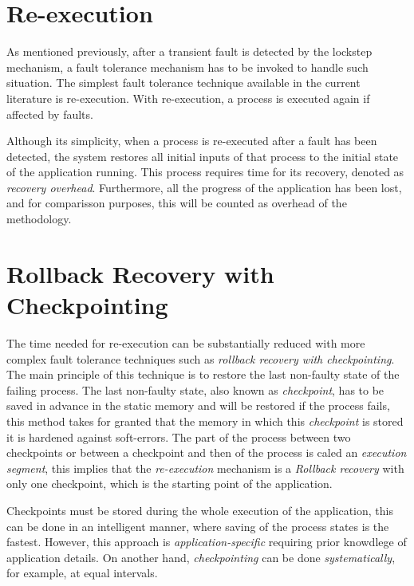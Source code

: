 \documentclass[10pt, a4paper]{report}
\begin{document}
\section{Re-execution}

As mentioned previously, after a transient fault is detected by the lockstep
mechanism, a fault tolerance mechanism has to be invoked to handle such
situation. The simplest fault tolerance technique available in the current
literature \cite{reexecution_paper} is re-execution. With re-execution, a
process is executed again if affected by faults. 

Although its simplicity, when a process is re-executed after a fault has been
detected, the system restores all initial inputs of that process to the initial
state of the application running. This process requires time for its recovery,
denoted as \emph{recovery overhead}. Furthermore, all the progress of the
application has been lost, and for comparisson purposes, this will be counted as
overhead of the methodology.

\section{Rollback Recovery with Checkpointing}

The time needed for re-execution can be substantially reduced with more complex
fault tolerance techniques such as \emph{rollback recovery with checkpointing}.
The main principle of this technique is to restore the last non-faulty state of
the failing process. The last non-faulty state, also known as \emph{checkpoint},
has to be saved in advance in the static memory and will be restored if the
process fails, this method takes for granted that the memory in which
this \emph{checkpoint} is stored it is hardened against soft-errors. The part of
the process between two checkpoints or between a checkpoint and then of the
process is caled an \emph{execution segment}, this implies that the
\emph{re-execution} mechanism is a \emph{Rollback recovery} with only one
checkpoint, which is the starting point of the application.

Checkpoints must be stored during the whole execution of the application, this
can be done in an intelligent manner, where saving of the process states is the
fastest. However, this approach is \emph{application-specific} requiring prior
knowdlege of application details. On another hand, \emph{checkpointing} can be
done \emph{systematically}, for example, at equal intervals.
\end{document}
